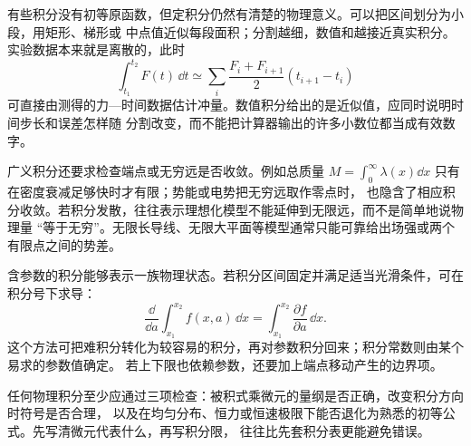 有些积分没有初等原函数，但定积分仍然有清楚的物理意义。可以把区间划分为小段，用矩形、梯形或
中点值近似每段面积；分割越细，数值和越接近真实积分。实验数据本来就是离散的，此时
\[
 \int_{t_1}^{t_2}F(t)\,\dd t
 \simeq\sum_i\frac{F_i+F_{i+1}}2(t_{i+1}-t_i)
\]
可直接由测得的力—时间数据估计冲量。数值积分给出的是近似值，应同时说明时间步长和误差怎样随
分割改变，而不能把计算器输出的许多小数位都当成有效数字。

广义积分还要求检查端点或无穷远是否收敛。例如总质量
$M=\int_0^\infty\lambda(x)\dd x$ 只有在密度衰减足够快时才有限；势能或电势把无穷远取作零点时，
也隐含了相应积分收敛。若积分发散，往往表示理想化模型不能延伸到无限远，而不是简单地说物理量
“等于无穷”。无限长导线、无限大平面等模型通常只能可靠给出场强或两个有限点之间的势差。

含参数的积分能够表示一族物理状态。若积分区间固定并满足适当光滑条件，可在积分号下求导：
\[
 \frac{\dd}{\dd a}\int_{x_1}^{x_2}f(x,a)\,\dd x
 =\int_{x_1}^{x_2}\frac{\partial f}{\partial a}\,\dd x.
\]
这个方法可把难积分转化为较容易的积分，再对参数积分回来；积分常数则由某个易求的参数值确定。
若上下限也依赖参数，还要加上端点移动产生的边界项。

任何物理积分至少应通过三项检查：被积式乘微元的量纲是否正确，改变积分方向时符号是否合理，
以及在均匀分布、恒力或恒速极限下能否退化为熟悉的初等公式。先写清微元代表什么，再写积分限，
往往比先套积分表更能避免错误。

